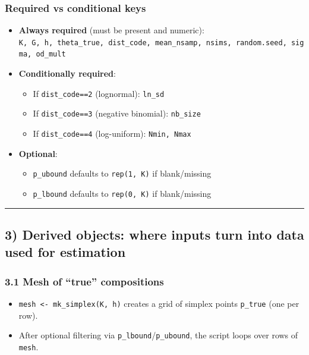 \documentclass[
]{article}
\providecommand{\tightlist}{%
  \setlength{\itemsep}{0pt}\setlength{\parskip}{0pt}}
\begin{document}
\subsubsection{Required vs conditional
keys}\label{required-vs-conditional-keys}

\begin{itemize}
\item
  \textbf{Always required} (must be present and numeric):\\
  \texttt{K,\ G,\ h,\ theta\_true,\ dist\_code,\ mean\_nsamp,\ nsims,\ random.seed,\ sigma,\ od\_mult}
\item
  \textbf{Conditionally required}:

  \begin{itemize}
  \tightlist
  \item
    If \texttt{dist\_code==2} (lognormal): \texttt{ln\_sd}
  \item
    If \texttt{dist\_code==3} (negative binomial): \texttt{nb\_size}
  \item
    If \texttt{dist\_code==4} (log-uniform): \texttt{Nmin,\ Nmax}
  \end{itemize}
\item
  \textbf{Optional}:

  \begin{itemize}
  \tightlist
  \item
    \texttt{p\_ubound} defaults to \texttt{rep(1,\ K)} if blank/missing
  \item
    \texttt{p\_lbound} defaults to \texttt{rep(0,\ K)} if blank/missing
  \end{itemize}
\end{itemize}

\begin{center}\rule{0.5\linewidth}{0.5pt}\end{center}

\subsection{3) Derived objects: where inputs turn into data used for
estimation}\label{derived-objects-where-inputs-turn-into-data-used-for-estimation}

\subsubsection{3.1 Mesh of ``true''
compositions}\label{mesh-of-true-compositions}

\begin{itemize}
\tightlist
\item
  \texttt{mesh\ \textless{}-\ mk\_simplex(K,\ h)} creates a grid of
  simplex points \texttt{p\_true} (one per row).
\item
  After optional filtering via \texttt{p\_lbound}/\texttt{p\_ubound},
  the script loops over rows of \texttt{mesh}.
\end{itemize}
\end{document}
